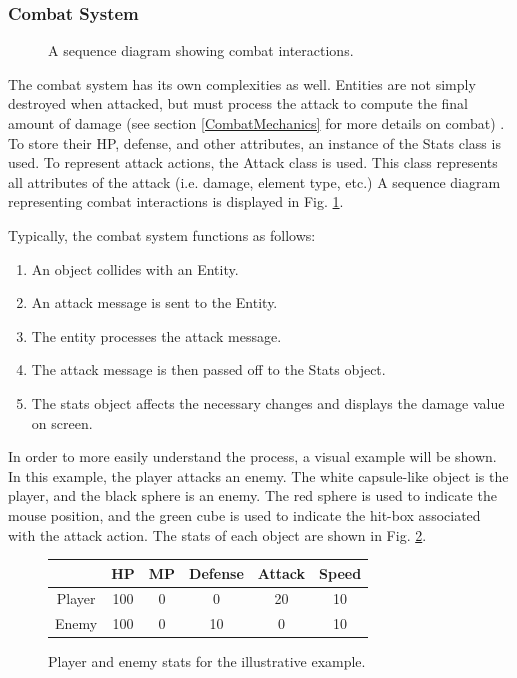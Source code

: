 \documentclass{article}
\begin{document}
\subsubsection{Combat System}

\begin{figure}[h!]


\caption{A sequence diagram showing combat interactions.}
\label{CombatInteractions}

\end{figure}

The combat system has its own complexities as well.  Entities are not simply destroyed when attacked, but must process the attack to compute the final amount of damage (see section \ref{CombatMechanics} for more details on combat) .  To store their HP, defense, and other attributes, an instance of the Stats class is used.  To represent attack actions, the Attack class is used.  This class represents all attributes of the attack (i.e. damage, element type, etc.)  A sequence diagram representing combat interactions is displayed in Fig. \ref{CombatInteractions}.

Typically, the combat system functions as follows:
\begin{enumerate}

\item An object collides with an Entity.
\item An attack message is sent to the Entity.
\item The entity processes the attack message.
\item The attack message is then passed off to the Stats object.
\item The stats object affects the necessary changes and displays the damage value on screen.

\end{enumerate}

In order to more easily understand the process, a visual example will be shown.  In this example, the player attacks an enemy.  The white capsule-like object is the player, and the black sphere is an enemy.  The red sphere is used to indicate the mouse position, and the green cube is used to indicate the hit-box associated with the attack action.  The stats of each object are shown in Fig. \ref{Stats}.

\begin{figure}[h!]
\begin{tabular}{|c|c|c|c|c|c|}
\hline
		&	HP	&	MP	&	Defense	&	Attack	&	Speed \\ \hline
Player	&	100	&	0	&	0	&	20	&	10 \\ \hline
Enemy	&	100	&	0	&	10	&	0	&	10 \\ \hline

\end{tabular}
\caption{Player and enemy stats for the illustrative example.}
\label{Stats}
\end{figure}
\end{document}
